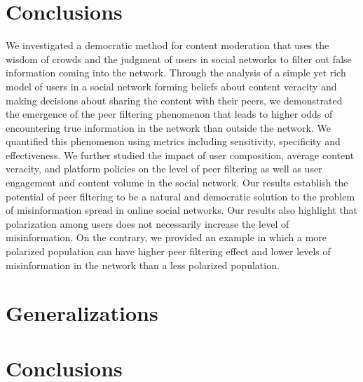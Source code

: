 





\section{Conclusions}\label{sec:Conclusions}
We investigated a democratic method for content moderation that uses the wisdom of crowds and the judgment of users in social networks to filter out false information coming into the network. Through the analysis of a simple yet rich model of users in a social network forming beliefs about content veracity and making decisions about sharing the content with their peers, we demonstrated the emergence of the peer filtering phenomenon that leads to higher odds of encountering true information in the network than outside the network. We quantified this phenomenon using metrics including sensitivity, specificity and effectiveness. We further studied the impact of user composition, average content veracity, and platform policies on the level of peer filtering as well as user engagement and content volume in the social network. Our results establish the potential of peer filtering to be a natural and democratic solution to the problem of misinformation spread in online social networks. Our results also highlight that polarization among users does not necessarily increase the level of misinformation. On the contrary, we provided an example in which a more polarized population can have higher peer filtering effect and lower levels of misinformation in the network than a less polarized population.

\section{Generalizations}

\section{Conclusions}


